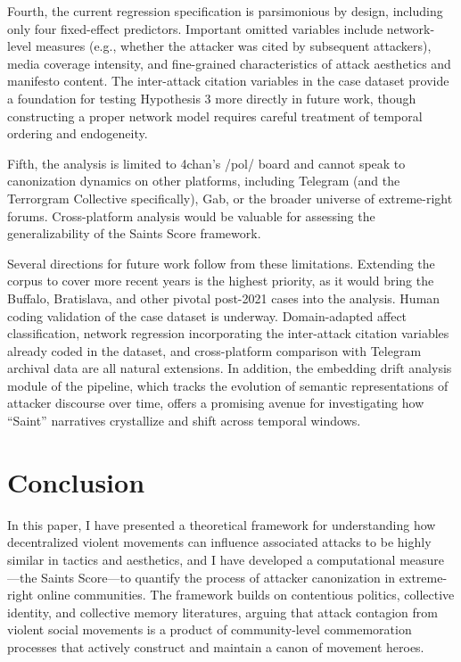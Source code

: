 \documentclass[12pt]{article}
\begin{document}
Fourth, the current regression specification is parsimonious by design, including only four fixed-effect predictors. Important omitted variables include network-level measures (e.g., whether the attacker was cited by subsequent attackers), media coverage intensity, and fine-grained characteristics of attack aesthetics and manifesto content. The inter-attack citation variables in the case dataset provide a foundation for testing Hypothesis 3 more directly in future work, though constructing a proper network model requires careful treatment of temporal ordering and endogeneity.

Fifth, the analysis is limited to 4chan's /pol/ board and cannot speak to canonization dynamics on other platforms, including Telegram (and the Terrorgram Collective specifically), Gab, or the broader universe of extreme-right forums. Cross-platform analysis would be valuable for assessing the generalizability of the Saints Score framework.

Several directions for future work follow from these limitations. Extending the corpus to cover more recent years is the highest priority, as it would bring the Buffalo, Bratislava, and other pivotal post-2021 cases into the analysis. Human coding validation of the case dataset is underway. Domain-adapted affect classification, network regression incorporating the inter-attack citation variables already coded in the dataset, and cross-platform comparison with Telegram archival data are all natural extensions. In addition, the embedding drift analysis module of the pipeline, which tracks the evolution of semantic representations of attacker discourse over time, offers a promising avenue for investigating how ``Saint'' narratives crystallize and shift across temporal windows.

\section{Conclusion}

In this paper, I have presented a theoretical framework for understanding how decentralized violent movements can influence associated attacks to be highly similar in tactics and aesthetics, and I have developed a computational measure---the Saints Score---to quantify the process of attacker canonization in extreme-right online communities. The framework builds on contentious politics, collective identity, and collective memory literatures, arguing that attack contagion from violent social movements is a product of community-level commemoration processes that actively construct and maintain a canon of movement heroes.
\end{document}

